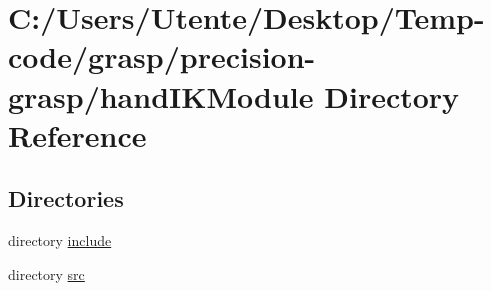 \section{C\+:/\+Users/\+Utente/\+Desktop/\+Temp-\/code/grasp/precision-\/grasp/hand\+I\+K\+Module Directory Reference}
\label{dir_cfd7e4976c9885418815f8c2073b9880}
\subsection*{Directories}
\begin{DoxyCompactItemize}
\item 
directory \hyperlink{dir_e2112a7c3de7657eb4c8f8a3c9ebcec2}{include}
\item 
directory \hyperlink{dir_22490a34635d7d1867ca856a970e0bec}{src}
\end{DoxyCompactItemize}
